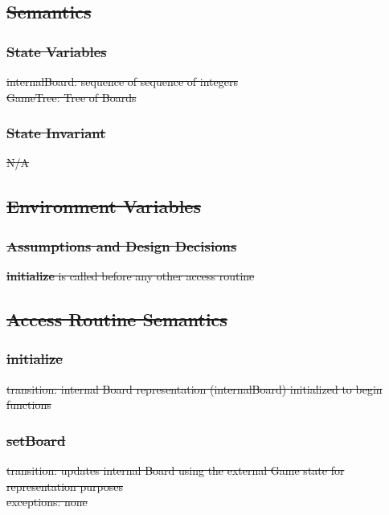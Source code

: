 \documentclass[12pt, titlepage]{article}
\begin{document}
    \subsection*{\sout{Semantics}}
        \subsubsection*{\sout{State Variables}}
            \sout{internalBoard: sequence of sequence of integers\\
            GameTree: Tree of Boards\\}
            
        \subsubsection*{\sout{State Invariant}}
            \sout{N/A}
            
    \subsection*{\sout{Environment Variables}}
            
        \subsubsection*{\sout{Assumptions and Design Decisions}}
            \sout{\textbf{initialize} is called before any other access routine}
            
    \subsection*{\sout{Access Routine Semantics}}
    \subsubsection*{\sout{initialize} }
            \sout{transition: internal Board representation (internalBoard) initialized to begin functions}\\
            
        \subsubsection*{\sout{setBoard} }
            \sout{transition: updates internal Board using the external Game state for representation purposes\\
            exceptions: none}
        
\end{document}
